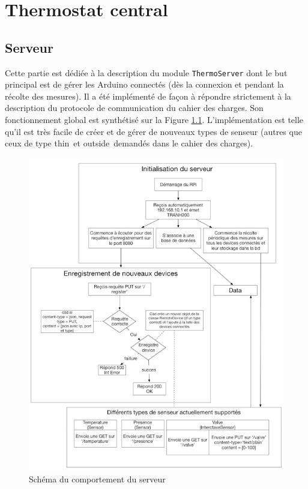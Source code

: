 \documentclass[11pt,a4paper,11pt]{report}
\begin{document}

\chapter{Thermostat central}

\section{Serveur}

Cette partie est dédiée à la description du module \texttt{ThermoServer} dont le but principal est de gérer les Arduino connectés (dès la connexion et pendant la récolte des mesures). Il a été implémenté de façon à répondre strictement à la description du protocole de communication du cahier des charges. Son fonctionnement global est synthétisé sur la Figure \ref{server_behav_dia}. L'implémentation est telle qu'il est très facile de créer et de gérer de nouveaux types de senseur (autres que ceux de type \og thin\fg ~et \og outside\fg  ~demandés dans le cahier des charges).

\begin{figure}
\centering
\includegraphics[width=\textwidth]{images/server_behav_dia.png}
\caption{Schéma du comportement du serveur}
\label{server_behav_dia}
\end{figure}
\end{document}
